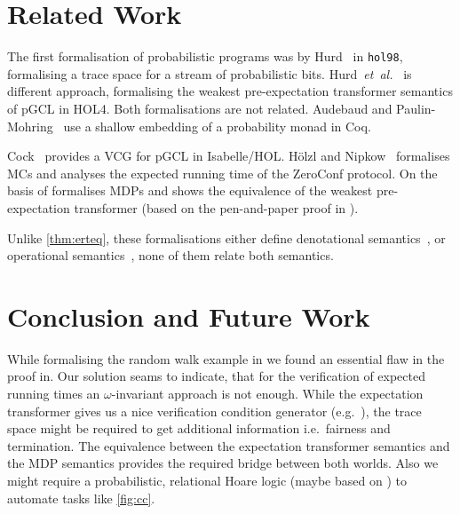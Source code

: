 \documentclass[a4paper]{llncs}
\newcommand{\etal}{\emph{et~al.}}
\begin{document}
\section{Related Work}

The first formalisation of probabilistic programs was by Hurd~\cite{hurd2002thesis} in \texttt{hol98}, formalising a trace space for a stream of probabilistic bits.
Hurd~\etal~\cite{hurd2005pgcl} is different approach, formalising the weakest pre-expectation transformer semantics of pGCL in HOL4.
Both formalisations are not related.
Audebaud and Paulin-Mohring~\cite{audebaud2009randomizedalgos} use a shallow embedding of a probability monad in Coq.

\pagebreak
\noindent 
Cock~\cite{cock2012pgcl} provides a VCG for pGCL in Isabelle/HOL.
Hölzl and Nipkow~\cite{hoelzl2012casestudies, hoelzl2013thesis} formalises MCs and analyses the expected running time of the ZeroConf protocol.
On the basis of \cite{hoelzl2013thesis} formalises MDPs and shows the equivalence of the weakest pre-expectation transformer (based on the pen-and-paper proof in \cite{gretz2014pgclsem}).

Unlike \autoref{thm:erteq}, these formalisations either define denotational semantics~\cite{hurd2005pgcl, audebaud2009randomizedalgos, cock2012pgcl}, or operational semantics~\cite{hurd2002thesis, hoelzl2012casestudies, hoelzl2013thesis}, none of them relate both semantics.

\section{Conclusion and Future Work}

While formalising the random walk example in \cite{kaminski2016ert} we found an essential flaw in the proof in\cite{kaminski2016ert-ext}.
Our solution seams to indicate, that for the verification of expected running times an $\omega$-invariant approach is not enough.
While the expectation transformer gives us a nice verification condition generator (e.g.~\cite{cock2012pgcl}), the trace space might be required to get additional information i.e.~fairness and termination.
The equivalence between the expectation transformer semantics and the MDP semantics provides the required bridge between both worlds.
Also we might require a probabilistic, relational Hoare logic (maybe based on \cite{lochbihler2016proboracles}) to automate tasks like \autoref{fig:cc}.




\end{document}
